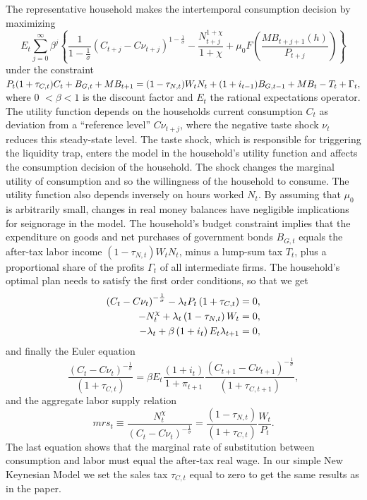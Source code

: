 \documentclass[12pt,a4paper,oneside,titlepage]{article}
\begin{document}
The representative household makes the intertemporal consumption decision by maximizing
\begin{equation}
E_t \sum_{j=0}^\infty \beta^j \left\{ \frac{1}{1- \frac{1}{\sigma}} \left(C_{t+j} - C\nu_{t+j}\right)^{1-\frac{1}{\sigma}} - \frac{N_{t+j}^{1+\chi}}{1+\chi} + \mu_0F \left(\frac{MB_{t+j+1}(h)}{P_{t+j}}\right)\right\} \nonumber
\end{equation}
under the constraint\newline
$P_t(1+\tau_{C,t})C_t + B_{G,t} + MB_{t+1} = (1-\tau_{N,t})W_tN_t + (1+i_{t-1})B_{G,t-1} + MB_t - T_t + \Gamma_t, \vspace{0.2cm}$
where 0 $< \beta < 1$ is the discount factor and $E_t$ the rational expectations operator. The utility function depends on the households current consumption $C_t$ as deviation from a “reference level” $C\nu_{t+j}$, where the negative taste shock $\nu_t$ reduces this steady-state level. The taste shock, which is responsible for triggering the liquidity trap, enters the model in the household's utility function and affects the consumption decision of the household. The shock changes the marginal utility of consumption and so the willingness of the household to consume.\newline
The utility function also depends inversely on hours worked $N_t$. By assuming that $\mu_0$ is arbitrarily small, changes in real money balances have negligible implications for seignorage in the model. The household's budget constraint implies that the expenditure on goods and net purchases of government bonds $B_{G,t}$ equals the after-tax labor income $ \left(1 - \tau_{N,t} \right) W_tN_t$, minus a lump-sum tax $T_t$, plus a proportional share of the profits $\Gamma_t$ of all intermediate firms. The household's optimal plan needs to satisfy the first order conditions, so that we get
\begin{align}
\vspace{-0.5cm} \left(C_t - C\nu_t\right)^{-\frac{1}{\sigma}}  - \lambda_tP_t \left(1 + \tau_{C,t} \right) = 0,\nonumber\\
-N_t^{\chi} + \lambda_t \left(1 - \tau_{N,t} \right) W_t = 0,\nonumber\\
-\lambda_t + \beta \left(1 + i_t \right) E_t\lambda_{t+1} = 0,\nonumber
\end{align}
and finally the Euler equation
\begin{equation}
\frac {\left(C_t - C\nu_t\right)^{-\frac{1}{\sigma}}}{\left(1 + \tau_{C,t} \right)} = \beta E_t \frac{\left(1 + i_t \right)}{1 + \pi_{t+1}} \frac{\left(C_{t+1} - C\nu_{t+1}\right)^{-\frac{1}{\sigma}}}{\left(1+ \tau_{C,t+1}\right)},
\end{equation}
and the aggregate labor supply relation
\begin{equation}
mrs_t \equiv \frac{N_t^\chi}{\left(C_t - C\nu_t\right)^{-\frac{1}{\sigma}}} = \frac{\left(1 - \tau_{N,t}\right)}{\left(1 + \tau_{C,t}\right)} \frac{W_t}{P_t}.
\end{equation}
The last equation shows that the marginal rate of substitution between consumption and labor must equal the after-tax real wage. In our simple New Keynesian Model we set the sales tax $\tau_{C,t}$ equal to zero to get the same results as in the paper.
\end{document}

